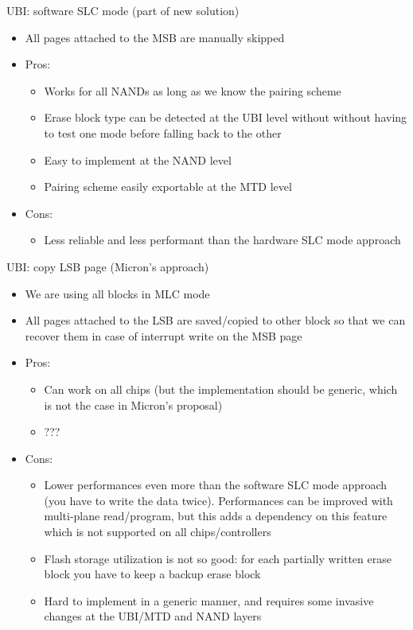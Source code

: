 \documentclass[obeyspaces,spaces,hyphens,dvipsnames]{beamer}
\begin{document}
\begin{frame}{UBI: software SLC mode (part of new solution)}
  \begin{itemize}
  \item All pages attached to the MSB are manually skipped
  \item Pros:
    \begin{itemize}
    \item Works for all NANDs as long as we know the pairing scheme
    \item Erase block type can be detected at the UBI level without
          without having to test one mode before falling back to the
	  other
    \item Easy to implement at the NAND level
    \item Pairing scheme easily exportable at the MTD level
    \end{itemize}
  \item Cons:
    \begin{itemize}
    \item Less reliable and less performant than the hardware SLC
          mode approach
    \end{itemize}
  \end{itemize}
\end{frame}

\begin{frame}{UBI: copy LSB page (Micron's approach)}
  \begin{itemize}
  \item We are using all blocks in MLC mode
  \item All pages attached to the LSB are saved/copied to other block
        so that we can recover them in case of interrupt write on the
	MSB page
  \item Pros:
    \begin{itemize}
    \item Can work on all chips (but the implementation should be
          generic, which is not the case in Micron's proposal)
    \item ???
    \end{itemize}
  \item Cons:
    \begin{itemize}
    \item Lower performances even more than the software SLC mode
          approach (you have to write the data twice). Performances
	  can be improved with multi-plane read/program, but this adds
	  a dependency on this feature which is not supported on all
	  chips/controllers
    \item Flash storage utilization is not so good: for each partially
          written erase block you have to keep a backup erase block
    \item Hard to implement in a generic manner, and requires some
          invasive changes at the UBI/MTD and NAND layers
    \end{itemize}
  \end{itemize}
\end{frame}
\end{document}
